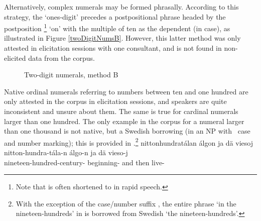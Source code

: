 Alternatively, complex numerals may be formed phrasally. According to this strategy, the ‘ones-digit’ precedes a postpositional phrase headed by the postposition \footnote{Note that  is often shortened to  in rapid speech.} 
‘on’ with the multiple of ten as the dependent  (in  case), as illustrated in Figure \vref{twoDigitNumsB}. %
However, this latter method was only attested in elicitation sessions with one consultant, and is not found in non-elicited data from the corpus.
\begin{figure}[h]\centering
{}
\caption{Two-digit numerals, method B}\label{twoDigitNumsB}
\end{figure}

Native ordinal numerals referring to numbers between ten and one hundred are only attested in the corpus in elicitation sessions, and speakers are quite inconsistent and unsure about them. 
The same is true for cardinal numerals larger than one hundred. %
The only example in the corpus for a numeral larger than one thousand is not native, but a Swedish borrowing (in an NP with \PS\ case and number marking); this is provided in .\footnote{With the exception of the case/number suffix , the entire phrase  ‘in the nineteen-hundreds’ in  is borrowed from Swedish  ‘the nineteen-hundreds’.}
\ea\label{complexNumEx4}
\glll	nittonhundratálan álgon ja dä viesoj\\
	nitton-hundra-tála-n álgo-n ja dä vieso-j\\
	nineteen-hundred-century- beginning- and then live-\\
	
\z



